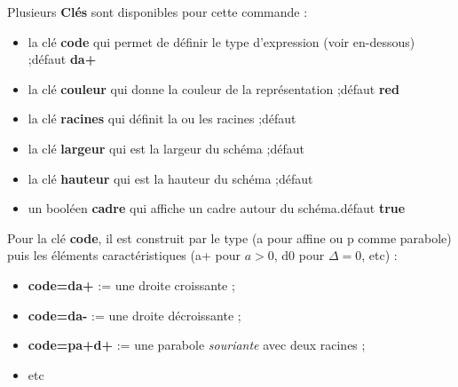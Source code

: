 \documentclass{article}
\newcommand\Cle[1]{{\bfseries\sffamily\textlangle #1\textrangle}}
\begin{document}
\begin{codecles}
Plusieurs \Cle{Clés} sont disponibles pour cette commande :

\begin{itemize}
	\item la clé \Cle{code} qui permet de définir le type d'expression (voir en-dessous) ;\hfill{}défaut \Cle{da+}
	\item la clé \Cle{couleur} qui donne la couleur de la représentation ;\hfill{}défaut \Cle{red}
	\item la clé \Cle{racines} qui définit la ou les racines ;\hfill{}défaut \Cle{2}
	\item la clé \Cle{largeur} qui est la largeur du schéma ;\hfill{}défaut \Cle{2}
	\item la clé \Cle{hauteur} qui est la hauteur du schéma ;\hfill{}défaut \Cle{1}
	\item un booléen \Cle{cadre} qui affiche un cadre autour du schéma.\hfill{}défaut \Cle{true}
\end{itemize}
\end{codecles}

\begin{codecles}
Pour la clé \Cle{code}, il est construit par le type (\textsf{a} pour affine ou \textsf{p} comme parabole) puis les éléments caractéristiques (\textsf{a+} pour $a>0$, \textsf{d0} pour $\Delta=0$, etc) :

\begin{itemize}
	\item \Cle{code=da+} := une droite croissante ;
	\item \Cle{code=da-} := une droite décroissante ;
	\item \Cle{code=pa+d+} := une parabole \textit{souriante} avec deux racines ;
	\item etc
\end{itemize}
\end{codecles}

\pagebreak
\end{document}
